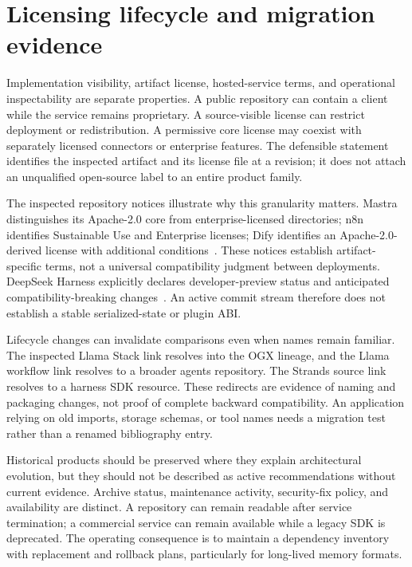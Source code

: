 \section{Licensing lifecycle and migration evidence}\label{sec:C22:lifecycle}
Implementation visibility, artifact license, hosted-service terms, and operational inspectability are separate properties. A public repository can contain a client while the service remains proprietary. A source-visible license can restrict deployment or redistribution. A permissive core license may coexist with separately licensed connectors or enterprise features. The defensible statement identifies the inspected artifact and its license file at a revision; it does not attach an unqualified open-source label to an entire product family.

The inspected repository notices illustrate why this granularity matters. Mastra distinguishes its Apache-2.0 core from enterprise-licensed directories; n8n identifies Sustainable Use and Enterprise licenses; Dify identifies an Apache-2.0-derived license with additional conditions~\cite{executionproduct019,executionproduct057,executionproduct066}. These notices establish artifact-specific terms, not a universal compatibility judgment between deployments. DeepSeek Harness explicitly declares developer-preview status and anticipated compatibility-breaking changes~\cite{executionproduct035}. An active commit stream therefore does not establish a stable serialized-state or plugin ABI.

Lifecycle changes can invalidate comparisons even when names remain familiar. The inspected Llama Stack link resolves into the OGX lineage, and the Llama workflow link resolves to a broader agents repository. The Strands source link resolves to a harness SDK resource. These redirects are evidence of naming and packaging changes, not proof of complete backward compatibility. An application relying on old imports, storage schemas, or tool names needs a migration test rather than a renamed bibliography entry.

Historical products should be preserved where they explain architectural evolution, but they should not be described as active recommendations without current evidence. Archive status, maintenance activity, security-fix policy, and availability are distinct. A repository can remain readable after service termination; a commercial service can remain available while a legacy SDK is deprecated. The operating consequence is to maintain a dependency inventory with replacement and rollback plans, particularly for long-lived memory formats.

